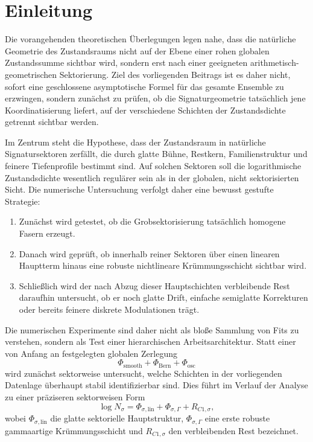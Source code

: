 \documentclass[11pt,a4paper]{article}
\theoremstyle{definition}
\theoremstyle{remark}
\begin{document}
\section{Einleitung}

Die vorangehenden theoretischen Überlegungen legen nahe, dass die natürliche Geometrie des Zustandsraums nicht auf der Ebene einer rohen globalen Zustandssumme sichtbar wird, sondern erst nach einer geeigneten arithmetisch-geometrischen Sektorierung. Ziel des vorliegenden Beitrags ist es daher nicht, sofort eine geschlossene asymptotische Formel für das gesamte Ensemble zu erzwingen, sondern zunächst zu prüfen, ob die Signaturgeometrie tatsächlich jene Koordinatisierung liefert, auf der verschiedene Schichten der Zustandsdichte getrennt sichtbar werden.

Im Zentrum steht die Hypothese, dass der Zustandsraum in natürliche Signatursektoren zerfällt, die durch glatte Bühne, Restkern, Familienstruktur und feinere Tiefenprofile bestimmt sind. Auf solchen Sektoren soll die logarithmische Zustandsdichte wesentlich regulärer sein als in der globalen, nicht sektorisierten Sicht. Die numerische Untersuchung verfolgt daher eine bewusst gestufte Strategie:
\begin{enumerate}[label=\arabic*)]
\item Zunächst wird getestet, ob die Grobsektorisierung tatsächlich homogene Fasern erzeugt.
\item Danach wird geprüft, ob innerhalb reiner Sektoren über einen linearen Hauptterm hinaus eine robuste nichtlineare Krümmungsschicht sichtbar wird.
\item Schließlich wird der nach Abzug dieser Hauptschichten verbleibende Rest daraufhin untersucht, ob er noch glatte Drift, einfache semiglatte Korrekturen oder bereits feinere diskrete Modulationen trägt.
\end{enumerate}

Die numerischen Experimente sind daher nicht als bloße Sammlung von Fits zu verstehen, sondern als Test einer hierarchischen Arbeitsarchitektur. Statt einer von Anfang an festgelegten globalen Zerlegung
\[
\Phi_{\mathrm{smooth}}+\Phi_{\mathrm{Bern}}+\Phi_{\mathrm{osc}}
\]
wird zunächst sektorweise untersucht, welche Schichten in der vorliegenden Datenlage überhaupt stabil identifizierbar sind. Dies führt im Verlauf der Analyse zu einer präziseren sektorweisen Form
\[
\log N_\sigma
=
\Phi_{\sigma,\mathrm{lin}}
+
\Phi_{\sigma,\Gamma}
+
R_{C1,\sigma},
\]
wobei \(\Phi_{\sigma,\mathrm{lin}}\) die glatte sektorielle Hauptstruktur, \(\Phi_{\sigma,\Gamma}\) eine erste robuste gammaartige Krümmungsschicht und \(R_{C1,\sigma}\) den verbleibenden Rest bezeichnet.
\end{document}
